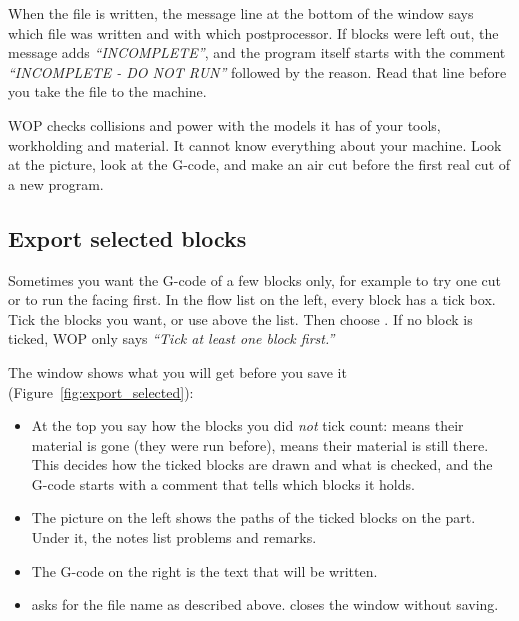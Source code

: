 
When the file is written, the message line at the bottom of the window says which file was written and with which postprocessor. If blocks were left out, the message adds \emph{``INCOMPLETE''}, and the program itself starts with the comment \emph{``INCOMPLETE - DO NOT RUN''} followed by the reason. Read that line before you take the file to the machine.

\begin{warningbox}
WOP checks collisions and power with the models it has of your tools, workholding and material. It cannot know everything about your machine. Look at the picture, look at the G-code, and make an air cut before the first real cut of a new program.
\end{warningbox}

\subsection{Export selected blocks}\label{sec:file:selected}
Sometimes you want the G-code of a few blocks only, for example to try one cut or to run the facing first. In the flow list on the left, every block has a tick box. Tick the blocks you want, or use  above the list. Then choose . If no block is ticked, WOP only says \emph{``Tick at least one block first.''}


The window shows what you will get before you save it (Figure~\ref{fig:export_selected}):
\begin{itemize}
  \item At the top you say how the blocks you did \emph{not} tick count:  means their material is gone (they were run before),  means their material is still there. This decides how the ticked blocks are drawn and what is checked, and the G-code starts with a comment that tells which blocks it holds.
  \item The picture on the left shows the paths of the ticked blocks on the part. Under it, the notes list problems and remarks.
  \item The G-code on the right is the text that will be written.
  \item {} asks for the file name as described above.  closes the window without saving.
\end{itemize}

